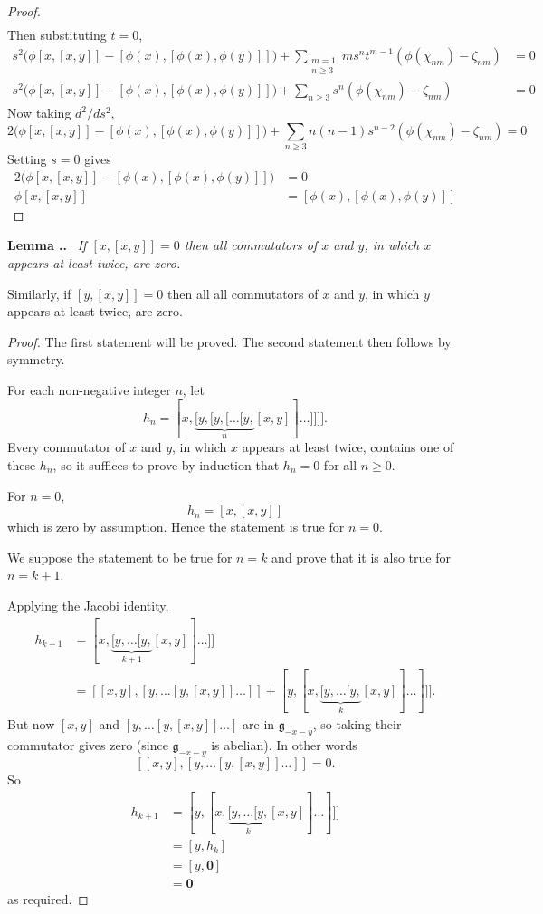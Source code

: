 \documentclass[honours]{UNSWthesis}
\newcommand{\g}{\mathfrak{g}}
\newcommand{\1}{\mathbf{e}_{1}}
\newcommand{\2}{\mathbf{e}_{3}}
\newcommand{\3}{\mathbf{e}_{3}}
\newcounter{Item}[section]
\newenvironment{Lemma}{\medskip
                            \refstepcounter{Item}
                            \noindent
                           {\bf Lemma \thesection.\theItem.}\ %
                            \begingroup \sl}
                           {\endgroup\medskip}
\begin{document}
\begin{proof}
\begin{align*}
\end{align*}
Then substituting $t=0$, 
\begin{align*}
s^{2}\big(\phi[x,[x,y]]-[\phi(x),[\phi(x),\phi(y)]]\big)+\sum\limits_{\substack{m=1\\ n \geq 3}}m s^{n}t^{m-1}(\phi(\chi_{nm})- \zeta_{nm})&=0 \\
s^{2}\big(\phi[x,[x,y]]-[\phi(x),[\phi(x),\phi(y)]]\big)+\sum\limits_{n \geq 3} s^{n}(\phi(\chi_{nm})- \zeta_{nm})&=0
\end{align*}
Now taking $d^{2}/ds^{2}$, 
\[
2\big(\phi[x,[x,y]]-[\phi(x),[\phi(x),\phi(y)]]\big)+\sum\limits_{n \geq 3} n(n-1)s^{n-2}(\phi(\chi_{nm})- \zeta_{nm})=0
\]
Setting $s=0$ gives
\begin{align*}
2\big(\phi[x,[x,y]]-[\phi(x),[\phi(x),\phi(y)]]\big)&=0 \\
\phi[x,[x,y]] &= [\phi(x),[\phi(x),\phi(y)]]
\end{align*}

\end{proof}

\begin{Lemma}\label{Two x's}
If $[x,[x,y]]=0 $ then all commutators of $x$ and $y$, in which $x$ appears at least twice, are zero.

Similarly, if $[y,[x,y]]=0$ then all all commutators of $x$ and $y$, in which $y$ appears at least twice, are zero.
\end{Lemma}

\begin{proof}
The first statement will be proved. The second statement then follows by symmetry.

For each non-negative integer $n$, let 
\[
h_n = [x,\underbrace{[y,[y,[\ldots[y,}_{n}[x,y]]\ldots]]]].
\]
Every commutator of $x$ and $y$, in which $x$ appears at least twice, contains one of these $h_n$, so it suffices to prove by induction that $h_n=0$ for all $n \geq 0$. 

For $n=0$, 
\[
h_n=[x,[x,y]]
\]
which is zero by assumption. Hence the statement is true for $n=0$.

We suppose the statement to be true for $n=k$ and prove that it is also true for $n=k+1$. 

Applying the Jacobi identity,
\begin{align*}
h_{k+1} &= [x,\underbrace{[y,\ldots[y,}_{k+1}[x,y]]\ldots]] \\
&= [[x,y],[y,\ldots[y,[x,y]]\ldots ]] + [y,[x,\underbrace{[y,\ldots[y,}_{k}[x,y]]\ldots]]].
\end{align*}
But now $[x,y]$ and $[y,\ldots[y,[x,y]]\ldots ]$ are in $\g_{-x-y}$, so taking their commutator gives zero (since $\g_{-x-y}$ is abelian). In other words 
\[
[[x,y],[y,\ldots[y,[x,y]]\ldots ]]=0.
\]
So  
\begin{align*}
h_{k+1} &=[y,[x,\underbrace{[y,\ldots[y,}_{k}[x,y]]\ldots]]] \\
&= [y,h_k] \\
&=[y,\mathbf{0}] \\
&= \mathbf{0}
\end{align*}
as required.
\end{proof}
\end{document}
